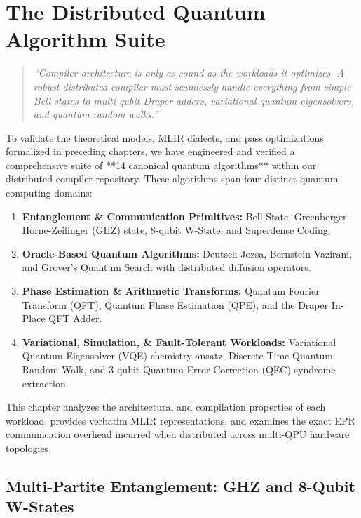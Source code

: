 \chapter{The Distributed Quantum Algorithm Suite}
\label{ch:quantum_algorithm_suite}

\begin{quote}
\textit{``Compiler architecture is only as sound as the workloads it optimizes. A robust distributed compiler must seamlessly handle everything from simple Bell states to multi-qubit Draper adders, variational quantum eigensolvers, and quantum random walks.''}
\end{quote}

To validate the theoretical models, MLIR dialects, and pass optimizations formalized in preceding chapters, we have engineered and verified a comprehensive suite of **14 canonical quantum algorithms** within our distributed compiler repository. These algorithms span four distinct quantum computing domains:
\begin{enumerate}
    \item \textbf{Entanglement \& Communication Primitives:} Bell State, Greenberger-Horne-Zeilinger (GHZ) state, 8-qubit W-State, and Superdense Coding.
    \item \textbf{Oracle-Based Quantum Algorithms:} Deutsch-Jozsa, Bernstein-Vazirani, and Grover's Quantum Search with distributed diffusion operators.
    \item \textbf{Phase Estimation \& Arithmetic Transforms:} Quantum Fourier Transform (QFT), Quantum Phase Estimation (QPE), and the Draper In-Place QFT Adder.
    \item \textbf{Variational, Simulation, \& Fault-Tolerant Workloads:} Variational Quantum Eigensolver (VQE) chemistry ansatz, Discrete-Time Quantum Random Walk, and 3-qubit Quantum Error Correction (QEC) syndrome extraction.
\end{enumerate}

This chapter analyzes the architectural and compilation properties of each workload, provides verbatim MLIR representations, and examines the exact EPR communication overhead incurred when distributed across multi-QPU hardware topologies.

\section{Multi-Partite Entanglement: GHZ and 8-Qubit W-States}
\label{sec:entanglement_suite}

